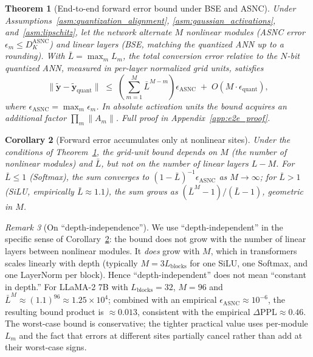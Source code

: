 \documentclass{article}
\theoremstyle{plain}
\newtheorem{theorem}{Theorem}[section]
\newtheorem{corollary}[theorem]{Corollary}
\theoremstyle{definition}
\theoremstyle{remark}
\newtheorem{remark}[theorem]{Remark}
\begin{document}
\begin{theorem}[End-to-end forward error bound under BSE and ASNC]
\label{thm:e2e_bound}
Under Assumptions~\ref{asm:quantization_alignment},
\ref{asm:gaussian_activations}, and~\ref{asm:lipschitz}, let the network
alternate $M$ nonlinear modules (ASNC error
$\epsilon_m\le D_K^{\mathrm{ASNC}}$) and linear layers (BSE, matching the
quantized ANN up to a rounding). With $\bar{L}=\max_m L_m$, the total
conversion error relative to the $N$-bit quantized ANN, measured in
per-layer normalized grid units, satisfies
\begin{equation}
\label{eq:e2e_bound}
\bigl\|\tilde{\mathbf{y}}-\tilde{\mathbf{y}}_{\mathrm{quant}}\bigr\|
\;\le\;
\left(\sum_{m=1}^{M}\bar{L}^{M-m}\right)\epsilon_{\mathrm{ASNC}}
\;+\; O(M\cdot \epsilon_{\mathrm{quant}}),
\end{equation}
where $\epsilon_{\mathrm{ASNC}}=\max_m\epsilon_m$. In absolute activation
units the bound acquires an additional factor $\prod_m\|A_m\|$. Full proof
in Appendix~\ref{app:e2e_proof}.
\end{theorem}

\begin{corollary}[Forward error accumulates only at nonlinear sites]
\label{cor:asnc_local_main}
Under the conditions of Theorem~\ref{thm:e2e_bound}, the grid-unit bound
depends on $M$ (the number of nonlinear modules) and $\bar{L}$, but
\emph{not} on the number of linear layers $L-M$. For $\bar{L}\le 1$
(Softmax), the sum converges to $(1-\bar{L})^{-1}\epsilon_{\mathrm{ASNC}}$
as $M\to\infty$; for $\bar{L}>1$ (SiLU, empirically
$\bar{L}\approx 1.1$), the sum grows as $(\bar{L}^M-1)/(\bar{L}-1)$,
geometric in $M$.
\end{corollary}

\begin{remark}[On ``depth-independence'']
\label{rem:depth_indep}
We use ``depth-independent'' in the specific sense of
Corollary~\ref{cor:asnc_local_main}: the bound does not grow with the number
of linear layers between nonlinear modules. It \emph{does} grow with $M$,
which in transformers scales linearly with depth (typically
$M=3L_{\mathrm{blocks}}$ for one SiLU, one Softmax, and one LayerNorm per
block). Hence ``depth-independent'' does not mean ``constant in depth.''
For LLaMA-2 7B with $L_{\mathrm{blocks}}=32$, $M=96$ and
$\bar{L}^M\approx(1.1)^{96}\approx 1.25\times 10^{4}$; combined with an
empirical $\epsilon_{\mathrm{ASNC}}\approx 10^{-6}$, the resulting bound
product is $\approx 0.013$, consistent with the empirical
$\Delta\mathrm{PPL}\approx 0.46$. The worst-case bound is conservative;
the tighter practical value uses per-module $L_m$ and the fact that errors
at different sites partially cancel rather than add at their worst-case
signs.
\end{remark}
\end{document}
